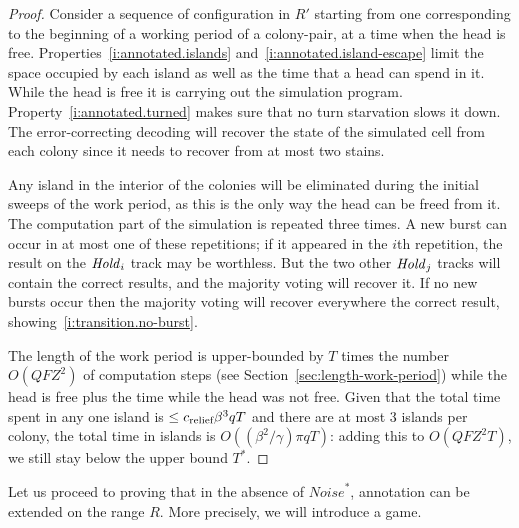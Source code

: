 \documentclass[11pt]{memoir}
\theoremstyle{definition} %
\renewcommand{\le}{\leq}
\newcommand{\fld}[1]{\ensuremath{\textit{#1\/}}}
\newcommand{\escno}{q}
\newcommand{\F}{F}
\newcommand{\Noise}{\mathit{Noise}}
\newcommand{\passno}{\pi}
\newcommand{\Q}{Q} %
\newcommand{\Rg}{R} %
\newcommand{\Tu}{T}
\newcommand{\Z}{Z} %
\newcommand{\Hold}{\fld{Hold}}
\newcommand{\cns}[1]{c_{\textrm{\upshape #1}}}
\newcommand{\CRelief}{\cns{relief}}
\begin{document}
\begin{proof}
  Consider a sequence of configuration in \( \Rg' \) starting from one corresponding to the
  beginning of a working period of a colony-pair, at a time when the head is free. 
  Properties~\eqref{i:annotated.islands} and~\eqref{i:annotated.island-escape} limit
  the space occupied by each island as well as the time that a head can spend in it.
  While the head is free it is carrying out the simulation program.
  Property~\eqref{i:annotated.turned} makes sure that no turn starvation slows it down.
  The error-correcting decoding will recover the state of the simulated cell from each colony
  since it needs to recover from at most two stains.

  Any island in the interior of the colonies will be eliminated during the initial
  sweeps of the work period, as this is the only way the head can be freed from it.
  The computation part of the simulation is repeated three times.
  A new burst can occur in at most one of these repetitions; if it appeared in the
  \( i \)th repetition, the result on the \( \Hold_{i} \) track may be worthless.
  But the two other \( \Hold_{j} \) tracks will contain the correct results, and the majority
  voting will recover it.
  If no new bursts occur then the majority voting will recover everywhere the correct result,
  showing~\eqref{i:transition.no-burst}.
  
  The length of the work period is upper-bounded by \( \Tu \) times the
  number \( O(\Q\F\Z^{2}) \) of computation
  steps (see Section~\ref{sec:length-work-period})
  while the head is free plus the time while the head was not free.
  Given that the total time spent in any one island is \( \le\CRelief \beta^{3}\escno\Tu \)
  and there are at most 3 islands per colony, the total time in islands
  is \( O((\beta^{2}/\gamma)\passno\escno\Tu ) \): adding this to \( O(\Q\F\Z^{2}\Tu) \),
  we still stay below the upper bound \( \Tu^{*} \).

\end{proof}

Let us proceed to proving that in the absence of \( \Noise^{*} \), annotation can be extended
on  the range \( \Rg \).
More precisely, we will introduce a game.
\end{document}
